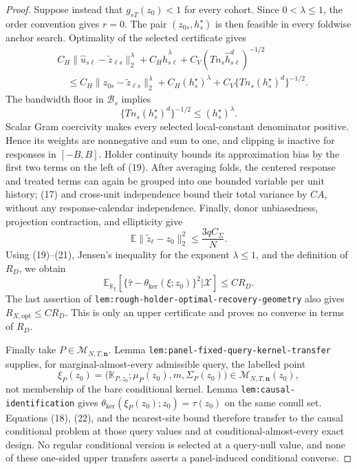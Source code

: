 \documentclass{article}
\begin{document}
\begin{proof}
Suppose instead that \(g_{sT}(z_0)<1\) for every cohort.  Since \(0<\lambda\le1\), the order convention gives \(r=0\).  The pair \((z_{0s},h_s^\star)\) is then feasible in every foldwise anchor search.  Optimality of the selected certificate gives
\[
\begin{aligned}
 &C_H\|\widehat u_{s\ell}-\widetilde z_{\ell s}\|_2^\lambda
 +C_H\widehat h_{s\ell}^\lambda
 +C_V(Tn_s\widehat h_{s\ell}^d)^{-1/2}\\
 &\quad\le C_H\|z_{0s}-\widetilde z_{\ell s}\|_2^\lambda
 +C_H(h_s^\star)^\lambda
 +C_V\{Tn_s(h_s^\star)^d\}^{-1/2}.
\end{aligned}                                               \tag{19}
\]
The bandwidth floor in \(\mathcal B_s\) implies
\[
 \{Tn_s(h_s^\star)^d\}^{-1/2}\le(h_s^\star)^\lambda.      \tag{20}
\]
Scalar Gram coercivity makes every selected local-constant denominator positive.  Hence its weights are nonnegative and sum to one, and clipping is inactive for responses in \([-B,B]\).  Holder continuity bounds its approximation bias by the first two terms on the left of (19).  After averaging folds, the centered response and treated terms can again be grouped into one bounded variable per unit history; (17) and cross-unit independence bound their total variance by \(CA\), without any response-calendar independence.  Finally, donor unbiasedness, projection contraction, and ellipticity give
\[
 \mathbb E\|\widetilde z_\ell-z_0\|_2^2
 \le\frac{3qC_\Sigma}{N}.                                  \tag{21}
\]
Using (19)--(21), Jensen's inequality for the exponent \(\lambda\le1\), and the definition of \(R_D\), we obtain
\[
 \mathbb E_{\mathbb K_\xi}\!\left[
 \{\widehat\tau-\theta_{\mathrm{ker}}(\xi;z_0)\}^2
 \mathrel{\Big|}\mathcal X\right]\le CR_D.               \tag{22}
\]
The last assertion of \texttt{lem:rough-holder-optimal-recovery-geometry} also gives \(R_{X,\mathrm{opt}}\le CR_D\).  This is only an upper certificate and proves no converse in terms of \(R_D\).

Finally take \(P\in\mathcal M_{N,T,\mathbf n}\).  Lemma \texttt{lem:panel-fixed-query-kernel-transfer} supplies, for marginal-almost-every admissible query, the labelled point
\[
 \xi_P(z_0)=\bigl(\mathbb K_{P,z_0};\mu_P(z_0),m,
 \Sigma_P(z_0)\bigr)\in\mathcal M_{N,T,\mathbf n}(z_0),    \tag{23}
\]
not membership of the bare conditional kernel.  Lemma \texttt{lem:causal-identification} gives
\(\theta_{\mathrm{ker}}(\xi_P(z_0);z_0)=\tau(z_0)\) on the same conull set.  Equations (18), (22), and the nearest-site bound therefore transfer to the causal conditional problem at those query values and at conditional-almost-every exact design.  No regular conditional version is selected at a query-null value, and none of these one-sided upper transfers asserts a panel-induced conditional converse.
\end{proof}
\end{document}
